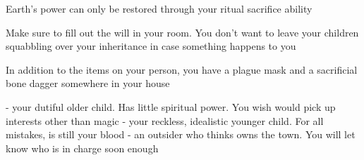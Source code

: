 \documentclass[char]{Pestilence}
\begin{document}
\begin{itemz}[Notes]
	\item Earth's power can only be restored through your ritual sacrifice ability
	\item Make sure to fill out the will in your room. You don't want to leave your children squabbling over your inheritance in case something happens to you
	\item In addition to the items on your person, you have a plague mask and a sacrificial bone dagger somewhere in your house
\end{itemz}

\begin{contacts}
	\contact{\cApprentice{}} - your dutiful older child. Has little spiritual power. You wish \cApprentice{\they} would pick up interests other than magic  
	\contact{\cRebel{}} - your reckless, idealistic younger child. For all \cRebel{\their} mistakes, \cRebel{\they} is still your blood 
	\contact{\cOutsider{}} - an outsider who thinks \cOutsider{\they} owns the town. You will let \cOutsider{\them} know who is in charge soon enough
\end{contacts}
\end{document}

